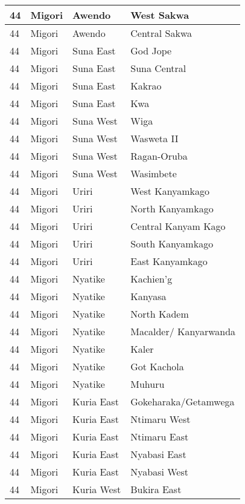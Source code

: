 \begin{table}[!ht]
\begin{tabular}{|l|l|l|l|}
        44 & Migori & Awendo & West Sakwa \\ \hline
        44 & Migori & Awendo & Central Sakwa \\ \hline
        44 & Migori & Suna East & God Jope \\ \hline
        44 & Migori & Suna East & Suna Central \\ \hline
        44 & Migori & Suna East & Kakrao \\ \hline
        44 & Migori & Suna East & Kwa \\ \hline
        44 & Migori & Suna West & Wiga \\ \hline
        44 & Migori & Suna West & Wasweta II \\ \hline
        44 & Migori & Suna West & Ragan-Oruba \\ \hline
        44 & Migori & Suna West & Wasimbete \\ \hline
        44 & Migori & Uriri & West Kanyamkago \\ \hline
        44 & Migori & Uriri & North Kanyamkago \\ \hline
        44 & Migori & Uriri & Central Kanyam Kago \\ \hline
        44 & Migori & Uriri & South Kanyamkago \\ \hline
        44 & Migori & Uriri & East Kanyamkago \\ \hline
        44 & Migori & Nyatike & Kachien’g \\ \hline
        44 & Migori & Nyatike & Kanyasa \\ \hline
        44 & Migori & Nyatike & North Kadem \\ \hline
        44 & Migori & Nyatike & Macalder/ Kanyarwanda \\ \hline
        44 & Migori & Nyatike & Kaler \\ \hline
        44 & Migori & Nyatike & Got Kachola \\ \hline
        44 & Migori & Nyatike & Muhuru \\ \hline
        44 & Migori & Kuria East & Gokeharaka/Getamwega \\ \hline
        44 & Migori & Kuria East & Ntimaru West \\ \hline
        44 & Migori & Kuria East & Ntimaru East \\ \hline
        44 & Migori & Kuria East & Nyabasi East \\ \hline
        44 & Migori & Kuria East & Nyabasi West \\ \hline
        44 & Migori & Kuria West & Bukira East \\ \hline

\end{tabular}
\end{table}
